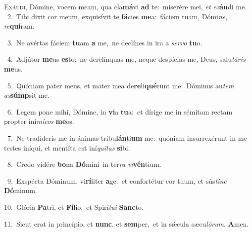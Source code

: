 \lettrine{\initial\textcolor{\initialcolor}{E}}{xáudi,} Dómine, vocem meam, qua cla\-\textbf{má}\-vi \textbf{ad} te:~\star miserére mei, \textit{et} \textit{ex}\-\textbf{áu}di me.\\
{\numbfont\textcolor{\numbcolor}{~2.}}~Tibi dixit cor meum, exquisívit te \textbf{fá}\-cies \textbf{me}\-a:~\star fáciem tuam, Dómi\-\textit{ne}\-, \textit{re}\-\textbf{quí}ram.\par
{\numbfont\textcolor{\numbcolor}{~3.}}~Ne avértas fáciem \textbf{tu}\-am \textbf{a} me,~\star ne declínes in ira a \textit{ser}\-\textit{vo} \textbf{tu}\-o.\par
{\numbfont\textcolor{\numbcolor}{~4.}}~Adjútor \textbf{me}\-us \textbf{es}\-to:~\star ne derelínquas me, neque despícias me, Deus, salu\-\textit{tá}\-\textit{ris} \textbf{me}\-us.\par
{\numbfont\textcolor{\numbcolor}{~5.}}~Quóniam pater meus, et mater mea de\-\textbf{re}\-li\-\textbf{qué}\-runt me:~\star Dóminus au\textit{tem} \textit{as}\-\textbf{súmp}sit me.\par
{\numbfont\textcolor{\numbcolor}{~6.}}~Legem pone mihi, Dómine, in \textbf{vi}\-a \textbf{tu}\-a:~\star et dírige me in sémitam rectam propter ini\-\textit{mí}\-\textit{cos} \textbf{me}\-os.\par
{\numbfont\textcolor{\numbcolor}{~7.}}~Ne tradíderis me in ánimas tribu\-\textbf{lán}\-ti\textbf{um} me:~\star quóniam insurrexérunt in me testes iníqui, et mentíta est iní\-\textit{qui}\-\textit{tas} \textbf{si}\-bi.\par
{\numbfont\textcolor{\numbcolor}{~8.}}~Credo vidére \textbf{bo}\-na \textbf{Dó}\-mini~\star in ter\textit{ra} \textit{vi}\-\textbf{vén}tium.\par
{\numbfont\textcolor{\numbcolor}{~9.}}~Exspécta Dóminum, vi\-\textbf{rí}\-liter \textbf{a}\-ge:~\star et confortétur cor tuum, et sús\-\textit{ti}\-\textit{ne} \textbf{Dó}\-minum.\par
{\numbfont\textcolor{\numbcolor}{10.}}~Glória \textbf{Pa}\-tri, et \textbf{Fí}\-lio,~\star et Spirí\-\textit{tu}\-\textit{i} \textbf{Sanc}\-to.\par
{\numbfont\textcolor{\numbcolor}{11.}}~Sicut erat in princípio, et \textbf{nunc}\-, et \textbf{sem}\-per,~\star et in sǽcula sæcu\-\textit{ló}\-\textit{rum}. \textbf{A}\-men.\par
